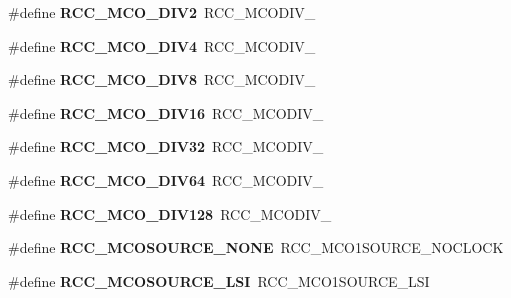 \begin{DoxyCompactItemize}
\#define {\bfseries R\+C\+C\+\_\+\+M\+C\+O\+\_\+\+D\+I\+V2}~R\+C\+C\+\_\+\+M\+C\+O\+D\+I\+V\+\_
\item 
\mbox{\label{group___h_a_l___r_c_c___aliased_gadde6fd8dbc7f1e750aea3903bedffa7d}} 
\#define {\bfseries R\+C\+C\+\_\+\+M\+C\+O\+\_\+\+D\+I\+V4}~R\+C\+C\+\_\+\+M\+C\+O\+D\+I\+V\+\_
\item 
\mbox{\label{group___h_a_l___r_c_c___aliased_ga00b1ed5dae888fa26fcaf66429c617da}} 
\#define {\bfseries R\+C\+C\+\_\+\+M\+C\+O\+\_\+\+D\+I\+V8}~R\+C\+C\+\_\+\+M\+C\+O\+D\+I\+V\+\_
\item 
\mbox{\label{group___h_a_l___r_c_c___aliased_ga4e8e30ec40f362037055d5977a9e2ea0}} 
\#define {\bfseries R\+C\+C\+\_\+\+M\+C\+O\+\_\+\+D\+I\+V16}~R\+C\+C\+\_\+\+M\+C\+O\+D\+I\+V\+\_
\item 
\mbox{\label{group___h_a_l___r_c_c___aliased_ga26c54546e41690456e3a57cd46a3b16a}} 
\#define {\bfseries R\+C\+C\+\_\+\+M\+C\+O\+\_\+\+D\+I\+V32}~R\+C\+C\+\_\+\+M\+C\+O\+D\+I\+V\+\_
\item 
\mbox{\label{group___h_a_l___r_c_c___aliased_ga3e2f0bbc95937a013cdb3cc6bec61fe8}} 
\#define {\bfseries R\+C\+C\+\_\+\+M\+C\+O\+\_\+\+D\+I\+V64}~R\+C\+C\+\_\+\+M\+C\+O\+D\+I\+V\+\_
\item 
\mbox{\label{group___h_a_l___r_c_c___aliased_ga13db6fb3b4264a8fff9f671faf393f1b}} 
\#define {\bfseries R\+C\+C\+\_\+\+M\+C\+O\+\_\+\+D\+I\+V128}~R\+C\+C\+\_\+\+M\+C\+O\+D\+I\+V\+\_
\item 
\mbox{\label{group___h_a_l___r_c_c___aliased_ga55362c6bb39a405d997b64cf8db9709e}} 
\#define {\bfseries R\+C\+C\+\_\+\+M\+C\+O\+S\+O\+U\+R\+C\+E\+\_\+\+N\+O\+NE}~R\+C\+C\+\_\+\+M\+C\+O1\+S\+O\+U\+R\+C\+E\+\_\+\+N\+O\+C\+L\+O\+CK
\item 
\mbox{\label{group___h_a_l___r_c_c___aliased_ga71ac33c61f4246489cc1c34bebe9b45d}} 
\#define {\bfseries R\+C\+C\+\_\+\+M\+C\+O\+S\+O\+U\+R\+C\+E\+\_\+\+L\+SI}~R\+C\+C\+\_\+\+M\+C\+O1\+S\+O\+U\+R\+C\+E\+\_\+\+L\+SI

\end{DoxyCompactItemize}
